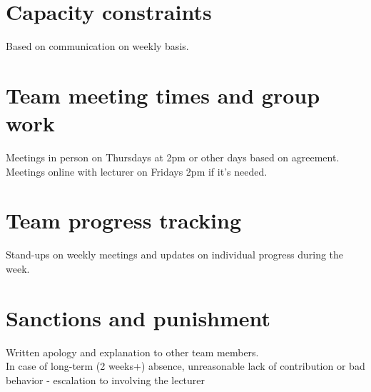 \documentclass{article}
\begin{document}
    \section{Capacity constraints} Based on communication on weekly basis.
    \section{Team meeting times and group work} Meetings in person on Thursdays at 2pm or other days based on agreement.\\ Meetings online with lecturer on Fridays 2pm if it's needed.
    \section{Team progress tracking} Stand-ups on weekly meetings and updates on individual progress during the week.
    \section{Sanctions and punishment} Written apology and explanation to other team members.\\[0,25cm]In case of long-term (2 weeks+) absence, unreasonable lack of contribution or bad behavior - escalation to involving the lecturer
    
\end{document}
